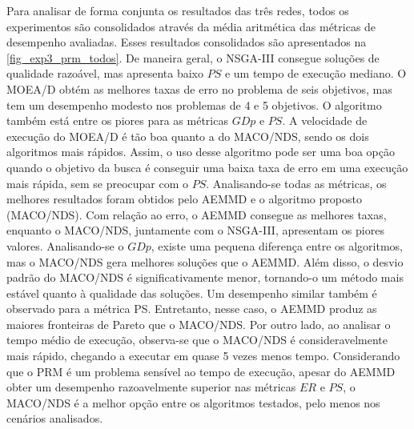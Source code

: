 Para analisar de forma conjunta os resultados das três redes, todos os experimentos são consolidados através da média aritmética das métricas de desempenho avaliadas. Esses resultados consolidados são apresentados na \autoref{fig_exp3_prm_todos}. De maneira geral, o NSGA-III consegue soluções de qualidade razoável, mas apresenta baixo $PS$ e um tempo de execução mediano. O MOEA/D obtém as melhores taxas de erro no problema de seis objetivos, mas tem um desempenho modesto nos problemas de 4 e 5 objetivos. O algoritmo também está entre os piores para as métricas $GDp$ e $PS$. A velocidade de execução do MOEA/D é tão boa quanto a do MACO/NDS, sendo os dois algoritmos mais rápidos. Assim, o uso desse algoritmo pode ser uma boa opção quando o objetivo da busca é conseguir uma baixa taxa de erro em uma execução mais rápida, sem se preocupar com o $PS$. Analisando-se todas as métricas, os melhores resultados foram obtidos pelo AEMMD e o algoritmo proposto (MACO/NDS). Com relação ao erro, o AEMMD consegue as melhores taxas, enquanto o MACO/NDS, juntamente com o NSGA-III, apresentam os piores valores. Analisando-se o $GDp$, existe uma pequena diferença entre os algoritmos, mas o MACO/NDS gera melhores soluções que o AEMMD. Além disso, o desvio padrão do MACO/NDS é significativamente menor, tornando-o um método mais estável quanto à qualidade das soluções. Um desempenho similar também é observado para a métrica PS. Entretanto, nesse caso, o AEMMD produz as maiores fronteiras de Pareto que o MACO/NDS. Por outro lado, ao analisar o tempo médio de execução, observa-se que o MACO/NDS é consideravelmente mais rápido, chegando a executar em quase 5 vezes menos tempo. Considerando que o PRM é um problema sensível ao tempo de execução, apesar do AEMMD obter um desempenho razoavelmente superior nas métricas $ER$ e $PS$, o MACO/NDS é a melhor opção entre os algoritmos testados, pelo menos nos cenários analisados.

